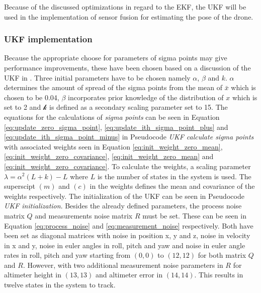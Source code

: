 \documentclass[../Head/report.tex]{subfiles}
\begin{document}
Because of the discussed optimizations in regard to the EKF, the UKF will be used in the implementation of sensor fusion for estimating the pose of the drone. 

\subsubsection{UKF implementation}
\label{sec:ukf_implementation}

Because the appropriate choose for parameters of sigma points may give performance improvements, these have been chosen based on a discussion of the UKF in \cite[p.~354]{KalmanAndBayesianFiltersInPython}. Three initial parameters have to be chosen namely $\alpha$, $\beta$ and $k$. $\alpha$ determines the amount of spread of the sigma points from the mean of $\bar{x}$ which is chosen to be 0.04, $\beta$ incorporates prior knowledge of the distribution of $x$ which is set to 2 and $\mathcal{k}$ is defined as a secondary scaling parameter set to 15. The equations for the calculations of \textit{sigma points} can be seen in Equation \ref{eq:update_zero_sigma_point}, \ref{eq:update_ith_sigma_point_plus} and \ref{eq:update_ith_sigma_point_minus} in Pseudocode \textit{UKF calculate sigma points} with associated weights seen in Equation \ref{eq:init_weight_zero_mean}, \ref{eq:init_weight_zero_covariance}, \ref{eq:init_weight_zero_mean} and \ref{eq:init_weight_zero_covariance}. To calculate the weights, a scaling parameter $\lambda = \alpha^2(L+k)-L$ where $L$ is the number of states in the system is used. The superscipt $(m)$ and $(c)$ in the weights defines the mean and covariance of the weights respectively. The initialization of the UKF can be seen in Pseudocode \textit{UKF initialization}. Besides the already defined parameters, the process noise matrix $Q$ and measurements noise matrix $R$ must be set. These can be seen in Equation \ref{eq:process_noise} and \ref{eq:measurement_noise} respectively. Both have been set as diagonal matrices with noise in position x, y and z, noise in velocity in x and y, noise in euler angles in roll, pitch and yaw and noise in euler angle rates in roll, pitch and yaw starting from $(0,0)$ to $(12,12)$ for both matrix $Q$ and $R$. However, with two additional measurement noise parameters in $R$ for altimeter height in $(13,13)$ and altimeter error in $(14,14)$. This results in twelve states in the system to track.
\end{document}
